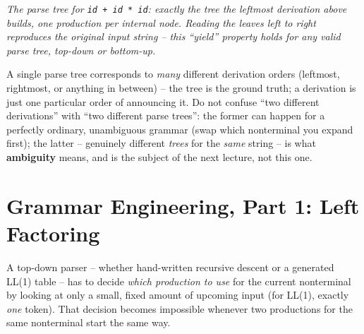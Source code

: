 \documentclass[full-course-notes.tex]{subfiles}
\begin{document}
\begin{center}
\end{center}
\begin{center}
\small\textit{The parse tree for \texttt{id + id * id}: exactly the tree the leftmost
derivation above builds, one production per internal node. Reading the leaves left to right
reproduces the original input string -- this ``yield'' property holds for \emph{any} valid
parse tree, top-down or bottom-up.}
\end{center}

\begin{examfocus}
A single parse tree corresponds to \emph{many} different derivation orders (leftmost,
rightmost, or anything in between) -- the tree is the ground truth; a derivation is just one
particular order of announcing it. Do not confuse ``two different derivations'' with ``two
different parse trees'': the former can happen for a perfectly ordinary, unambiguous grammar
(swap which nonterminal you expand first); the latter -- genuinely different \emph{trees} for
the \emph{same} string -- is what \textbf{ambiguity} means, and is the subject of the next
lecture, not this one.
\end{examfocus}

\section{Grammar Engineering, Part 1: Left Factoring}
\label{sec:l8-left-factoring}

\dbtag A top-down parser -- whether hand-written recursive descent or a generated LL(1) table
-- has to decide \emph{which production to use} for the current nonterminal by looking at only
a small, fixed amount of upcoming input (for LL(1), exactly \emph{one} token). That decision
becomes impossible whenever two productions for the same nonterminal start the same way.
\end{document}
